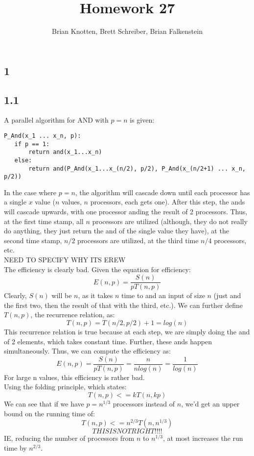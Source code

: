 \documentclass[letterpaper,notitlepage,twoside]{article}
\begin{document}
\title{Homework 27}
\author{Brian Knotten, Brett Schreiber, Brian Falkenstein}
\maketitle
\subsection*{1}
\subsection*{1.1}
A parallel algorithm for AND with $p=n$ is given:
\begin{verbatim}
P_And(x_1 ... x_n, p):
   if p == 1:
       return and(x_1...x_n)
   else:
       return and(P_And(x_1...x_(n/2), p/2), P_And(x_(n/2+1) ... x_n, p/2))
\end{verbatim}
In the case where $p=n$, the algorithm will cascade down until each processor has a single $x$ value ($n$ values, $n$ processors, each gets one). After this step, the ands will cascade upwards, with one processor anding the result of 2 processors. Thus, at the first time stamp, all $n$ processors are utilized (although, they do not really do anything, they just return the and of the single value they have), at the second time stamp, $n/2$ processors are utilized, at the third time $n/4$ processors, etc. \\
NEED TO SPECIFY WHY ITS EREW \\
The efficiency is clearly bad. Given the equation for efficiency: 
$$ E(n, p) = \frac{S(n)}{pT(n, p)}$$
Clearly, $S(n)$ will be $n$, as it takes $n$ time to and an input of size $n$ (just and the first two, then the result of that with the third, etc.). We can further define $T(n, p)$, the recurrence relation, as:
$$T(n, p) = T(n/2, p/2) + 1 = log(n)$$
This recurrence relation is true because at each step, we are simply doing the and of 2 elements, which takes constant time. Further, these ands happen simultaneously. Thus, we can compute the efficiency as:
$$ E(n, p) = \frac{S(n)}{pT(n, p)} = \frac{n}{nlog(n)} = \frac{1}{log(n)}$$ 
For large n values, this efficiency is rather bad. \\
Using the folding principle, which states: 
$$T(n, p) <= kT(n, kp)$$
We can see that if we have $p=n^{1/3}$ processors instead of $n$, we'd get an upper bound on the running time of:
$$T(n, p) <= n^{2/3}T(n, n^{1/3})$$
$$THIS IS NOT RIGHT!!!!$$
IE, reducing the number of processors from $n$ to $n^{1/3}$, at most increases the run time by $n^{2/3}$. 
\end{document}
